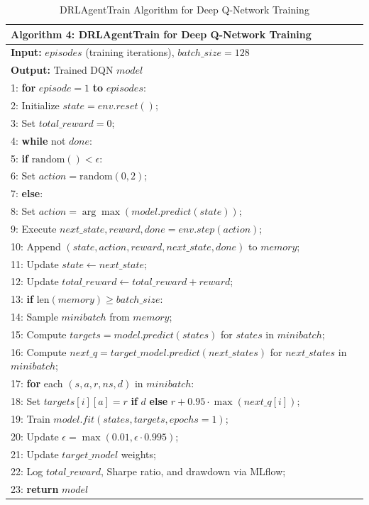 \begin{table}[h]
\small
\centering
\begin{tabular}{|p{14cm}|}
\hline
\textbf{Algorithm 4: DRLAgentTrain for Deep Q-Network Training} \\
\hline
\textbf{Input:} $episodes$ (training iterations), $batch\_size=128$ \\
\textbf{Output:} Trained DQN $model$ \\
\hline
1: \textbf{for} $episode = 1$ \textbf{to} $episodes$: \\
2: \quad Initialize $state = env.reset()$; \\
3: \quad Set $total\_reward = 0$; \\
4: \quad \textbf{while} not $done$: \\
5: \quad\quad \textbf{if} $\text{random}() < \epsilon$: \\
6: \quad\quad\quad Set $action = \text{random}(0, 2)$; \\
7: \quad\quad \textbf{else}: \\
8: \quad\quad\quad Set $action = \arg\max(model.predict(state))$; \\
9: \quad\quad Execute $next\_state, reward, done = env.step(action)$; \\
10: \quad\quad Append $(state, action, reward, next\_state, done)$ to $memory$; \\
11: \quad\quad Update $state \leftarrow next\_state$; \\
12: \quad\quad Update $total\_reward \leftarrow total\_reward + reward$; \\
13: \quad\quad \textbf{if} $\text{len}(memory) \geq batch\_size$: \\
14: \quad\quad\quad Sample $minibatch$ from $memory$; \\
15: \quad\quad\quad Compute $targets = model.predict(states)$ for $states$ in $minibatch$; \\
16: \quad\quad\quad Compute $next\_q = target\_model.predict(next\_states)$ for $next\_states$ in $minibatch$; \\
17: \quad\quad\quad \textbf{for} each $(s, a, r, ns, d)$ in $minibatch$: \\
18: \quad\quad\quad\quad Set $targets[i][a] = r$ \textbf{if} $d$ \textbf{else} $r + 0.95 \cdot \max(next\_q[i])$; \\
19: \quad\quad\quad Train $model.fit(states, targets, epochs=1)$; \\
20: \quad\quad Update $\epsilon = \max(0.01, \epsilon \cdot 0.995)$; \\
21: \quad Update $target\_model$ weights; \\
22: \quad Log $total\_reward$, Sharpe ratio, and drawdown via MLflow; \\
23: \textbf{return} $model$ \\
\hline
\end{tabular}


\caption{DRLAgentTrain Algorithm for Deep Q-Network Training}
\label{tab:drlagenttrain_algorithm}
\end{table}

